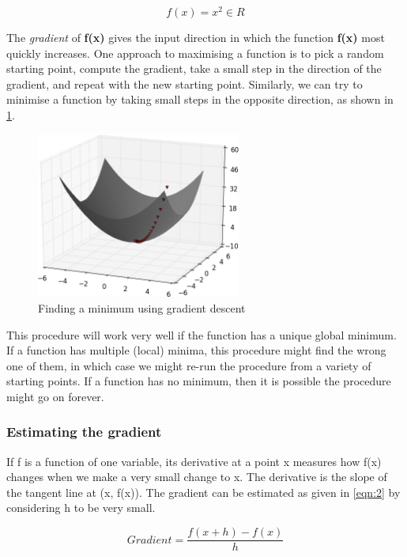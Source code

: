 \documentclass[a4paper, 12pt, oneside, BCOR1cm,toc=chapterentrywithdots]{scrbook}
\begin{document}
\begin{equation} \label{gradient}
f(x) = x^2  \in R
\end{equation}

The \textit{gradient} of \textbf{f(x)} gives the input direction in which the function \textbf{f(x)} most quickly increases. One approach to maximising a function is to pick a random starting point, compute the gradient, take a small step in the direction of the gradient, and repeat with the new starting point. Similarly, we can try to minimise a function by taking small steps in the opposite direction, as shown in \ref{fig:pic0}. 

\begin{figure}[h]
\centering
\includegraphics[width=0.6\textwidth]{image1.png}
\caption{Finding a minimum using gradient descent}
\label{fig:pic0}
\end{figure}

This procedure will work very well if the function has a unique global minimum. If a function has multiple (local) minima, this procedure might find the wrong one of them, in which case we might re-run the procedure from a variety of starting points. If a function has no minimum, then it is possible the procedure might go on forever.

\subsubsection{Estimating the gradient}


If f is a function of one variable, its derivative at a point x measures how f(x) changes when we make a very small change to x. The derivative is the slope of the tangent line at (x, f(x)). The gradient can be estimated as given in \ref{eqn:2} by considering h to be very small.

\begin{equation} \label{eqn:2}
Gradient = \frac{f(x+h) - f(x)}{h}
\end{equation}
\end{document}
